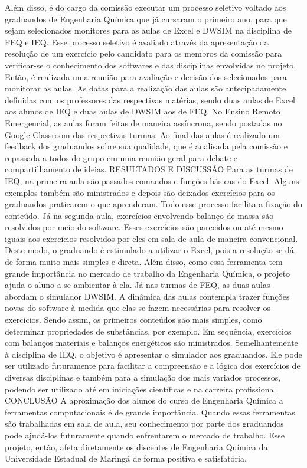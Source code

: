 Além disso, é do cargo da comissão executar um processo seletivo voltado aos graduandos 
de Engenharia Química que já cursaram o primeiro ano, para que sejam selecionados monitores 
para as aulas de Excel e DWSIM na disciplina de FEQ e IEQ. Esse processo seletivo é avaliado 
através da apresentação da resolução de um exercício pelo candidato para os membros da comissão 
para verificar-se o conhecimento dos softwares e das disciplinas envolvidas no projeto. Então, é 
realizada uma reunião para avaliação e decisão dos selecionados para monitorar as aulas.
As datas para a realização das aulas são antecipadamente definidas com os professores das 
respectivas matérias, sendo duas aulas de Excel aos alunos de IEQ e duas aulas de DWSIM aos de 
FEQ. No Ensino Remoto Emergencial, as aulas foram feitas de maneira assíncrona, sendo postadas 
no Google Classroom das respectivas turmas. 
Ao final das aulas é realizado um feedback dos graduandos sobre sua qualidade, que é 
analisada pela comissão e repassada a todos do grupo em uma reunião geral para debate e 
compartilhamento de ideias.
RESULTADOS E DISCUSSÃO
Para as turmas de IEQ, na primeira aula são passados comandos e funções básicas do Excel. 
Alguns exemplos também são ministrados e depois são deixados exercícios para os graduandos 
praticarem o que aprenderam. Todo esse processo facilita a fixação do conteúdo. Já na segunda 
aula, exercícios envolvendo balanço de massa são resolvidos por meio do software. Esses 
exercícios são parecidos ou até mesmo iguais aos exercícios resolvidos por eles em sala de aula de 
maneira convencional. Deste modo, o graduando é estimulado a utilizar o Excel, pois a resolução 
se dá de forma muito mais simples e direta. Além disso, como essa ferramenta tem grande 
importância no mercado de trabalho da Engenharia Química, o projeto ajuda o aluno a se ambientar 
à ela.
Já nas turmas de FEQ, as duas aulas abordam o simulador DWSIM. A dinâmica das aulas 
contempla trazer funções novas do software à medida que elas se fazem necessárias para resolver 
os exercícios. Sendo assim, os primeiros conteúdos são mais simples, como determinar 
propriedades de substâncias, por exemplo. Em sequência, exercícios com balanços materiais e 
balanços energéticos são ministrados. Semelhantemente à disciplina de IEQ, o objetivo é 
apresentar o simulador aos graduandos. Ele pode ser utilizado futuramente para facilitar a 
compreensão e a lógica dos exercícios de diversas disciplinas e também para a simulação dos mais 
variados processos, podendo ser utilizado até em iniciações científicas e na carreira profissional.
CONCLUSÃO
A aproximação dos alunos do curso de Engenharia Química a ferramentas computacionais 
é de grande importância. Quando essas ferramentas são trabalhadas em sala de aula, seu 
conhecimento por parte dos graduandos pode ajudá-los futuramente quando enfrentarem o 
mercado de trabalho. Esse projeto, então, afeta diretamente os discentes de Engenharia Química 
da Universidade Estadual de Maringá de forma positiva e satisfatória.

